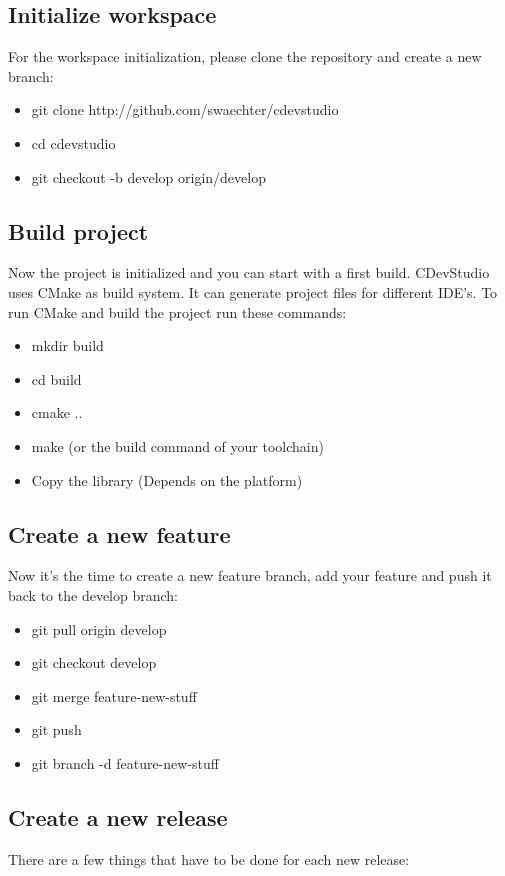 \documentclass{article}
\begin{document}
\subsection{Initialize workspace}
For the workspace initialization, please clone the repository and create a new branch:

\begin{itemize}
	\item git clone http://github.com/swaechter/cdevstudio
	\item cd cdevstudio
	\item git checkout -b develop origin/develop
\end{itemize}

\subsection{Build project}
Now the project is initialized and you can start with a first build. CDevStudio uses CMake as build system. It can generate project files for different IDE's. To run CMake and build the project run these commands:

\begin{itemize}
	\item mkdir build
	\item cd build
	\item cmake ..
	\item make (or the build command of your toolchain)
	\item Copy the library (Depends on the platform)
\end{itemize}

\subsection{Create a new feature}
Now it's the time to create a new feature branch, add your feature and push it back to the develop branch:

\begin{itemize}
	\item git pull origin develop
	\item git checkout develop
	\item git merge feature-new-stuff
	\item git push
	\item git branch -d feature-new-stuff
\end{itemize}

\subsection{Create a new release}
There are a few things that have to be done for each new release:
\end{document}
